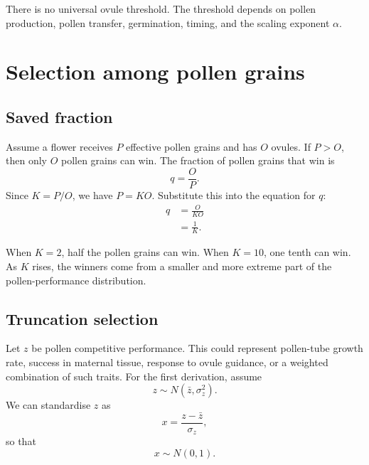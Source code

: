\documentclass[12pt]{article}
\begin{document}
\begin{conclusionbox}
There is no universal ovule threshold. The threshold depends on pollen production, pollen transfer, germination, timing, and the scaling exponent $\alpha$.
\end{conclusionbox}

\section{Selection among pollen grains}

\subsection{Saved fraction}

Assume a flower receives $P$ effective pollen grains and has $O$ ovules. If $P>O$, then only $O$ pollen grains can win. The fraction of pollen grains that win is
\begin{equation}
q=\frac{O}{P}.
\end{equation}
Since $K=P/O$, we have $P=KO$. Substitute this into the equation for $q$:
\begin{align}
q&=\frac{O}{KO} \\
&=\frac{1}{K}.
\label{eq:q}
\end{align}

\begin{conclusionbox}
When $K=2$, half the pollen grains can win. When $K=10$, one tenth can win. As $K$ rises, the winners come from a smaller and more extreme part of the pollen-performance distribution.
\end{conclusionbox}

\subsection{Truncation selection}

Let $z$ be pollen competitive performance. This could represent pollen-tube growth rate, success in maternal tissue, response to ovule guidance, or a weighted combination of such traits. For the first derivation, assume
\begin{equation}
z\sim N(\bar{z},\sigma_z^2).
\end{equation}
We can standardise $z$ as
\begin{equation}
x=\frac{z-\bar{z}}{\sigma_z},
\end{equation}
so that
\begin{equation}
x\sim N(0,1).
\end{equation}
\end{document}

